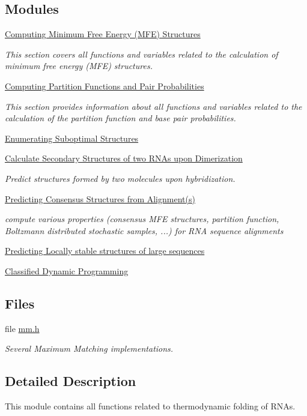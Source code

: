 \subsection*{Modules}
\begin{DoxyCompactItemize}
\item 
\hyperlink{group__mfe__fold}{Computing Minimum Free Energy (\+M\+F\+E) Structures}
\begin{DoxyCompactList}\small\item\em This section covers all functions and variables related to the calculation of minimum free energy (M\+FE) structures. \end{DoxyCompactList}\item 
\hyperlink{group__pf__fold}{Computing Partition Functions and Pair Probabilities}
\begin{DoxyCompactList}\small\item\em This section provides information about all functions and variables related to the calculation of the partition function and base pair probabilities. \end{DoxyCompactList}\item 
\hyperlink{group__subopt__fold}{Enumerating Suboptimal Structures}
\item 
\hyperlink{group__cofold}{Calculate Secondary Structures of two R\+N\+As upon Dimerization}
\begin{DoxyCompactList}\small\item\em Predict structures formed by two molecules upon hybridization. \end{DoxyCompactList}\item 
\hyperlink{group__consensus__fold}{Predicting Consensus Structures from Alignment(s)}
\begin{DoxyCompactList}\small\item\em compute various properties (consensus M\+FE structures, partition function, Boltzmann distributed stochastic samples, ...) for R\+NA sequence alignments \end{DoxyCompactList}\item 
\hyperlink{group__local__fold}{Predicting Locally stable structures of large sequences}
\item 
\hyperlink{group__class__fold}{Classified Dynamic Programming}
\end{DoxyCompactItemize}
\subsection*{Files}
\begin{DoxyCompactItemize}
\item 
file \hyperlink{mm_8h}{mm.\+h}
\begin{DoxyCompactList}\small\item\em Several Maximum Matching implementations. \end{DoxyCompactList}\end{DoxyCompactItemize}


\subsection{Detailed Description}
This module contains all functions related to thermodynamic folding of R\+N\+As. 

